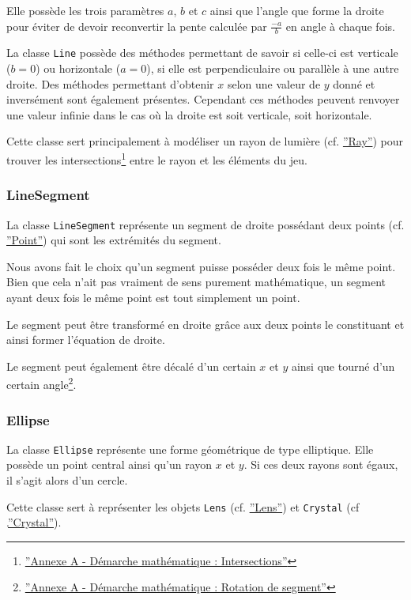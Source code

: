 \documentclass[]{article}
\begin{document}
Elle possède les trois paramètres $ a $, $ b $ et $ c $ ainsi que l'angle
que forme la droite pour éviter de devoir reconvertir la pente calculée par $ \frac{-a}{b} $
en angle à chaque fois.

La classe \texttt{Line} possède des méthodes permettant de savoir si celle-ci est 
verticale ($ b = 0 $) ou horizontale ($ a = 0 $), si elle est perpendiculaire ou parallèle à une autre droite.
Des méthodes permettant d'obtenir $ x $ selon une valeur de $ y $ donné et inversément sont également
présentes. Cependant ces méthodes peuvent renvoyer une valeur infinie dans le cas où la droite 
est soit verticale, soit horizontale.

Cette classe sert principalement à modéliser un rayon de lumière (cf. \hyperref[Ray]{''Ray''}) pour trouver 
les intersections\footnote{\hyperref[AnnexeIntersects]{''Annexe A - Démarche mathématique : Intersections''}} entre le rayon et les éléments du jeu.

\subsubsection{\label{LineSegment}LineSegment}

La classe \texttt{LineSegment} représente un segment de droite possédant
deux points (cf. \hyperref[Point]{''Point''}) qui sont les extrémités du segment.

Nous avons fait le choix qu'un segment puisse posséder deux fois le même point.
Bien que cela n'ait pas vraiment de sens purement mathématique, un segment
ayant deux fois le même point est tout simplement un point.

Le segment peut être transformé en droite grâce aux deux points
le constituant et ainsi former l'équation de droite.

Le segment peut également être décalé d'un certain $ x $ et $ y $ ainsi que tourné 
d'un certain angle\footnote{\hyperref[AnnexeRotation]{''Annexe A - Démarche mathématique : Rotation de segment''}}.

\subsubsection{\label{Ellipse}Ellipse}

La classe \texttt{Ellipse} représente une forme géométrique de type elliptique.
Elle possède un point central ainsi qu'un rayon $x$ et $y$. Si ces deux
rayons sont égaux, il s'agit alors d'un cercle.

Cette classe sert à représenter les objets \texttt{Lens} (cf. \hyperref[Lens]{''Lens''}) et \texttt{Crystal} (cf .\hyperref[Crystal]{''Crystal''}).
\end{document}
